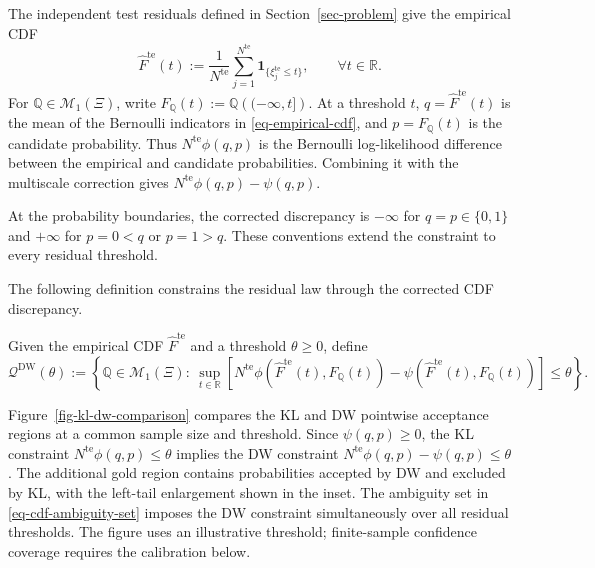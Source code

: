 \documentclass[review,11pt,3p,authoryear,nopreprintline]{elsarticle}
\begin{document}
The independent test residuals defined in Section~\ref{sec-problem} give the empirical CDF
\begin{equation}
  \widehat F^{\mathrm{te}}(t):=\frac{1}{N^{\mathrm{te}}}\sum_{j=1}^{N^{\mathrm{te}}}\mathbf 1_{\{\xi_j^{\mathrm{te}}\le t\}},\qquad \forall t\in\mathbb R.
  \label{eq-empirical-cdf}
\end{equation}
For $\mathbb Q\in\mathcal M_1(\Xi)$, write $F_{\mathbb Q}(t):=\mathbb Q\left(({-\infty},t]\right)$. At a threshold $t$, $q=\widehat F^{\mathrm{te}}(t)$ is the mean of the Bernoulli indicators in \eqref{eq-empirical-cdf}, and $p=F_{\mathbb Q}(t)$ is the candidate probability. Thus $N^{\mathrm{te}}\phi(q,p)$ is the Bernoulli log-likelihood difference between the empirical and candidate probabilities. Combining it with the multiscale correction gives $N^{\mathrm{te}}\phi(q,p)-\psi(q,p)$.

At the probability boundaries, the corrected discrepancy is $-\infty$ for $q=p\in\{0,1\}$ and $+\infty$ for $p=0<q$ or $p=1>q$. These conventions extend the constraint to every residual threshold.

The following definition constrains the residual law through the corrected CDF discrepancy.

\begin{definition}
  \label{definition-dw-ambiguity-set}
  Given the empirical CDF $\widehat F^{\mathrm{te}}$ and a threshold $\theta\ge0$, define
  \begin{equation} 
    \label{eq-cdf-ambiguity-set}
      \mathcal Q^{\mathrm{DW}}(\theta):=\left\{\mathbb Q\in\mathcal M_1(\Xi):\ 
      \sup_{t\in\mathbb R}\left[ N^{\mathrm{te}}\phi\!\left(\widehat F^{\mathrm{te}}(t),F_{\mathbb Q}(t)\right) 
       {}-\psi\!\left(\widehat F^{\mathrm{te}}(t),F_{\mathbb Q}(t)\right)\right]\le\theta\right\}. 
  \end{equation} 
\end{definition}

Figure~\ref{fig-kl-dw-comparison} compares the KL and DW pointwise acceptance regions at a common sample size and threshold. Since $\psi(q,p)\ge0$, the KL constraint $N^{\mathrm{te}}\phi(q,p)\le\theta$ implies the DW constraint $N^{\mathrm{te}}\phi(q,p)-\psi(q,p)\le\theta$. The additional gold region contains probabilities accepted by DW and excluded by KL, with the left-tail enlargement shown in the inset. The ambiguity set in \eqref{eq-cdf-ambiguity-set} imposes the DW constraint simultaneously over all residual thresholds. The figure uses an illustrative threshold; finite-sample confidence coverage requires the calibration below.
\end{document}
